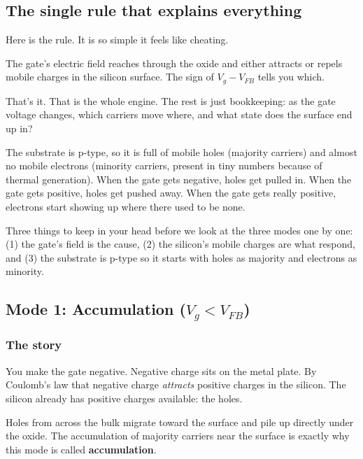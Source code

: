 \documentclass[11pt]{article}
\begin{document}
\subsection{The single rule that explains everything}

Here is the rule. It is so simple it feels like cheating.

\begin{keyidea}
The gate's electric field reaches through the oxide and either attracts or repels mobile charges in the silicon surface. The sign of $V_g - V_{FB}$ tells you which.
\end{keyidea}

That's it. That is the whole engine. The rest is just bookkeeping: as the gate voltage changes, which carriers move where, and what state does the surface end up in?

The substrate is p-type, so it is full of mobile holes (majority carriers) and almost no mobile electrons (minority carriers, present in tiny numbers because of thermal generation). When the gate gets negative, holes get pulled in. When the gate gets positive, holes get pushed away. When the gate gets really positive, electrons start showing up where there used to be none.

\begin{pause}
Three things to keep in your head before we look at the three modes one by one: (1) the gate's field is the cause, (2) the silicon's mobile charges are what respond, and (3) the substrate is p-type so it starts with holes as majority and electrons as minority.
\end{pause}

\subsection{Mode 1: Accumulation ($V_g < V_{FB}$)}

\subsubsection{The story}

You make the gate negative. Negative charge sits on the metal plate. By Coulomb's law that negative charge \emph{attracts} positive charges in the silicon. The silicon already has positive charges available: the holes.

Holes from across the bulk migrate toward the surface and pile up directly under the oxide. The accumulation of majority carriers near the surface is exactly why this mode is called \textbf{accumulation}.
\end{document}

